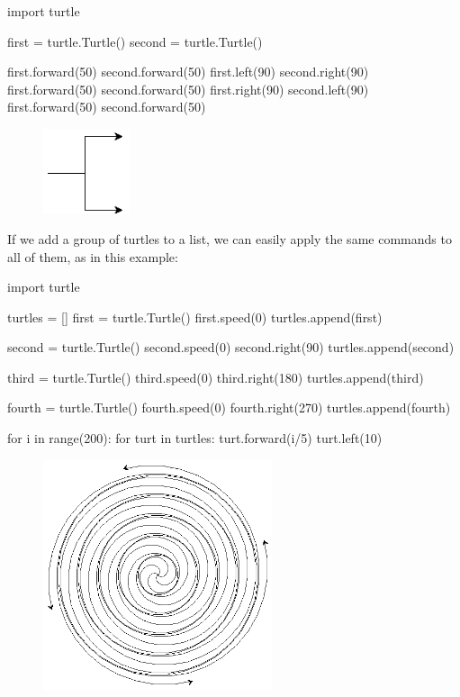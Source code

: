 \documentclass[11pt]{cselabheader}
\begin{document}
\begin{python3code}
import turtle

first = turtle.Turtle()
second = turtle.Turtle()

first.forward(50)
second.forward(50)
first.left(90)
second.right(90)
first.forward(50)
second.forward(50)
first.right(90)
second.left(90)
first.forward(50)
second.forward(50)
\end{python3code}

\begin{figure}[h]
  \centering
  \includegraphics[width=1.0in]{img/turtle_prong}
\end{figure}

If we add a group of turtles to a list, we can easily apply the same commands to all of them, as in this example:

\begin{python3code}
import turtle

turtles = []
first = turtle.Turtle()
first.speed(0)
turtles.append(first)

second = turtle.Turtle()
second.speed(0)
second.right(90)
turtles.append(second)

third = turtle.Turtle()
third.speed(0)
third.right(180)
turtles.append(third)

fourth = turtle.Turtle()
fourth.speed(0)
fourth.right(270)
turtles.append(fourth)

for i in range(200):
    for turt in turtles:
        turt.forward(i/5)
        turt.left(10)
\end{python3code}

\begin{figure}[h]
  \centering
  \includegraphics[width=0.6\textwidth]{img/fancy_spiral}
\end{figure}
\end{document}
